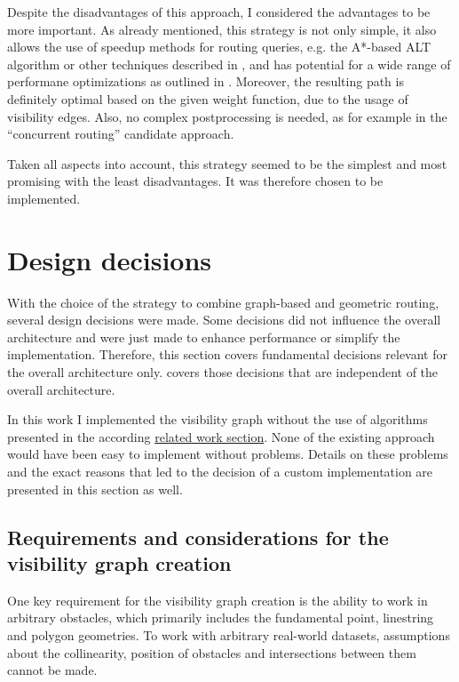 		Despite the disadvantages of this approach, I considered the advantages to be more important.
		As already mentioned, this strategy is not only simple, it also allows the use of speedup methods for routing queries, e.g. the A*-based ALT algorithm or other techniques described in , and has potential for a wide range of performane optimizations as outlined in .
		Moreover, the resulting path is definitely optimal based on the given weight function, due to the usage of visibility edges. 
		Also, no complex postprocessing is needed, as for example in the \enquote{concurrent routing} candidate approach.
		
		Taken all aspects into account, this strategy seemed to be the simplest and most promising with the least disadvantages.
		It was therefore chosen to be implemented.

\section{Design decisions}
\label{sec:design-decisions}

	With the choice of the strategy to combine graph-based and geometric routing, several design decisions were made.
	Some decisions did not influence the overall architecture and were just made to enhance performance or simplify the implementation.
	Therefore, this section covers fundamental decisions relevant for the overall architecture only.
	 covers those decisions that are independent of the overall architecture.
	
	In this work I implemented the visibility graph without the use of algorithms presented in the according \hyperref[subsec:related-work:visibility-graph]{related work section}.
	None of the existing approach would have been easy to implement without problems.
	Details on these problems and the exact reasons that led to the decision of a custom implementation are presented in this section as well.
	
	\subsection{Requirements and considerations for the visibility graph creation}
	
		One key requirement for the visibility graph creation is the ability to work in arbitrary obstacles, which primarily includes the fundamental point, linestring and polygon geometries.
		To work with arbitrary real-world datasets, assumptions about the collinearity, position of obstacles and intersections between them cannot be made.
		
